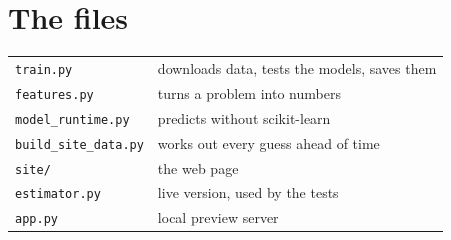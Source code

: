 \documentclass[11pt,a4paper]{article}
\begin{document}
\section{The files}

\begin{center}
\begin{tabular}{@{}ll@{}}
\toprule
\texttt{train.py} & downloads data, tests the models, saves them\\
\texttt{features.py} & turns a problem into numbers\\
\texttt{model\_runtime.py} & predicts without scikit-learn\\
\texttt{build\_site\_data.py} & works out every guess ahead of time\\
\texttt{site/} & the web page\\
\texttt{estimator.py} & live version, used by the tests\\
\texttt{app.py} & local preview server\\
\bottomrule
\end{tabular}
\end{center}
\end{document}
